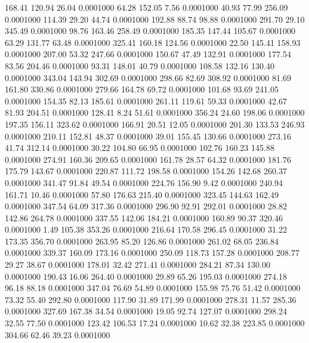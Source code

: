  168.41  120.94   26.04   0.0001000
  64.28  152.05    7.56   0.0001000
  40.93   77.99  256.09   0.0001000
 114.39   29.20   44.74   0.0001000
 192.88   88.74   98.88   0.0001000
 291.70   29.10  345.49   0.0001000
  98.76  163.46  258.49   0.0001000
 185.35  147.44  105.67   0.0001000
  63.29  131.77   63.48   0.0001000
 325.41  160.18  124.56   0.0001000
  22.50  145.41  158.93   0.0001000
 207.00   53.32  247.66   0.0001000
 150.67   47.49  132.91   0.0001000
 177.54   83.56  204.46   0.0001000
  93.31  148.01   40.79   0.0001000
 108.58  132.16  130.40   0.0001000
 343.04  143.94  302.69   0.0001000
 298.66   82.69  308.92   0.0001000
  81.69  161.80  330.86   0.0001000
 279.66  164.78   69.72   0.0001000
 101.68   93.69  241.05   0.0001000
 154.35   82.13  185.61   0.0001000
 261.11  119.61   59.33   0.0001000
  42.67   81.93  204.51   0.0001000
 128.41    8.24   51.61   0.0001000
 356.24   24.60  198.06   0.0001000
 197.35  156.11  323.62   0.0001000
 166.91   20.51   12.05   0.0001000
 201.30  133.53  246.93   0.0001000
 210.11  152.81   48.37   0.0001000
  39.01  155.45  130.66   0.0001000
 273.16   41.74  312.14   0.0001000
  30.22  104.80   66.95   0.0001000
 102.76  160.23  145.88   0.0001000
 274.91  160.36  209.65   0.0001000
 161.78   28.57   64.32   0.0001000
 181.76  175.79  143.67   0.0001000
 220.87  111.72  198.58   0.0001000
 154.26  142.68  260.37   0.0001000
 341.47   91.84   49.54   0.0001000
 224.76  156.90    9.42   0.0001000
 240.94  161.71   10.46   0.0001000
  57.80  176.63  215.40   0.0001000
 323.45  144.63  162.49   0.0001000
 347.54   64.09  317.36   0.0001000
 296.90   92.91  292.01   0.0001000
  28.82  142.86  264.78   0.0001000
 337.55  142.06  184.21   0.0001000
 160.89   90.37  320.46   0.0001000
   1.49  105.38  353.26   0.0001000
 216.64  170.58  296.45   0.0001000
  31.22  173.35  356.70   0.0001000
 263.95   85.20  126.86   0.0001000
 261.02   68.05  236.84   0.0001000
 339.37  160.09  173.16   0.0001000
 250.09  118.73  157.28   0.0001000
 208.77   29.27   38.67   0.0001000
 178.01   32.42  271.41   0.0001000
 284.21   87.34  130.00   0.0001000
 190.43   16.06  264.40   0.0001000
  29.89   65.26  195.03   0.0001000
 274.18   96.18   88.18   0.0001000
 347.04   76.69   54.89   0.0001000
 155.98   75.76   51.42   0.0001000
  73.32   55.40  292.80   0.0001000
 117.90   31.89  171.99   0.0001000
 278.31   11.57  285.36   0.0001000
 327.69  167.38   34.54   0.0001000
  19.05   92.74  127.07   0.0001000
 298.24   32.55   77.50   0.0001000
 123.42  106.53   17.24   0.0001000
  10.62   32.38  223.85   0.0001000
 304.66   62.46   39.23   0.0001000
